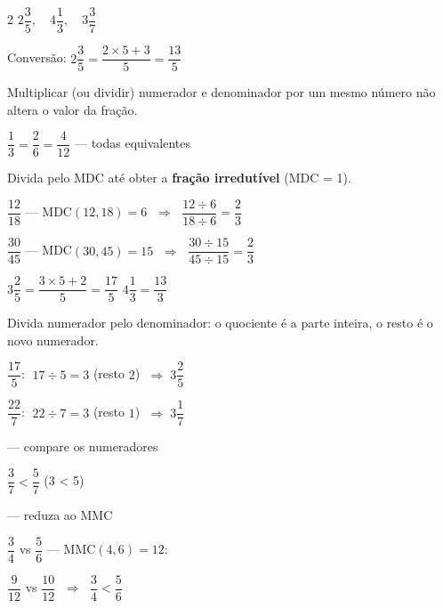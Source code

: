 \documentclass[12pt,twoside]{article}
\begin{document}
\begin{multicols}{2}
$2\dfrac{3}{5},\quad 4\dfrac{1}{3},\quad 3\dfrac{3}{7}$

Conversão: $2\dfrac{3}{5} = \dfrac{2\times5+3}{5} = \dfrac{13}{5}$



Multiplicar (ou dividir) numerador e denominador por um mesmo número não altera o valor da fração.


$\dfrac{1}{3} = \dfrac{2}{6} = \dfrac{4}{12}$ — todas equivalentes


Divida pelo MDC até obter a \textbf{fração irredutível} (MDC = 1).

$\dfrac{12}{18}$ — MDC$(12,18) = 6$ $\;\Rightarrow\;$ $\dfrac{12\div6}{18\div6} = \dfrac{2}{3}$ \checkmark

$\dfrac{30}{45}$ — MDC$(30,45) = 15$ $\;\Rightarrow\;$ $\dfrac{30\div15}{45\div15} = \dfrac{2}{3}$ \checkmark




$3\dfrac{2}{5} = \dfrac{3\times5+2}{5} = \dfrac{17}{5}$ \qquad $4\dfrac{1}{3} = \dfrac{13}{3}$


Divida numerador pelo denominador: o quociente é a parte inteira, o resto é o novo numerador.

$\dfrac{17}{5}$: $\;17 \div 5 = 3$ (resto $2$) $\;\Rightarrow\; 3\dfrac{2}{5}$

$\dfrac{22}{7}$: $\;22 \div 7 = 3$ (resto $1$) $\;\Rightarrow\; 3\dfrac{1}{7}$


 — compare os numeradores

$\dfrac{3}{7} < \dfrac{5}{7}$ \quad (3 < 5)

 — reduza ao MMC

$\dfrac{3}{4}$ vs $\dfrac{5}{6}$ — MMC$(4,6)=12$:

$\dfrac{9}{12}$ vs $\dfrac{10}{12}$ $\;\Rightarrow\;$ $\dfrac{3}{4} < \dfrac{5}{6}$


\end{multicols}
\end{document}
